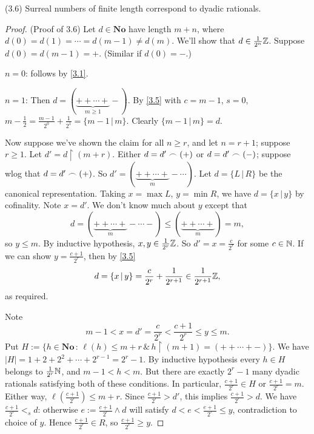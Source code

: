 \begin{proposition} (3.6)
Surreal numbers of finite length correspond to dyadic rationals.
\label{3.6}
\end{proposition}

\begin{proof} (Proof of 3.6)
Let $d\in\mathbf{No}$ have length $m+n$, where $d(0) = d(1) = \cdots = d(m-1) \ne d(m)$. We'll show that 
$d\in\frac1{2^n}\mathbb{Z}$. Suppose $d(0) = d(m-1) = {+}$. (Similar if $d(0) = {-}$.) 
\begin{description}
\item $n=0$: follows by \eqref{3.1}.
\item $n=1$: Then $d = (\underbrace{++\cdots+}_{m\ge1}-)$. By \eqref{3.5} with $c = m-1$, $s=0$, $m-\frac12 = \frac{m-1}{2^0} + \frac{1}{2^1} = \{m-1 \,|\, m\}$. Clearly $\{m-1 \,|\, m\} = d$.
\end{description}
Now suppose we've shown the claim for all $n\ge r$, and let $n = r+1$; suppose $r\ge 1$. Let $d' = d\restriction (m+r)$.
Either $d = d'\frown (+)$ or $d=d'\frown (-)$; suppose wlog that $d = d'\frown (+)$. So $d' = (\underbrace{++\cdots+}_{m}-\cdots)$. Let $d = \{L \,|\, R\}$ be the canonical representation.
Taking $x=\max L$, $y = \min R$, we have $d = \{x \,|\, y\}$ by cofinality. Note $x = d'$. We don't know much about $y$ 
except that
\[ d = (\underbrace{++\cdots +}_{m}-\cdots -)\le (\underbrace{++\cdots+}_{m}) = m, \]
so $y\le m$. By inductive hypothesis, $x,y\in \frac1{2^r}\mathbb{Z}$. So $d' = x = \frac{c}{2^r}$ for some $c\in\mathbb{N}$. 
If we can show $y = \frac{c+1}{2^r}$, then by \eqref{3.5} 
\[ d = \{x \,|\, y \} = \frac{c}{2^r} + \frac{1}{2^{r+1}} \in \frac1{2^{r+1}}\mathbb{Z}, \]
as required.

Note 
\[m-1<x = d' = \frac{c}{2^r} < \frac{c+1}{2^r} \le y \le m. \]
Put $H := \{ h\in\mathbf{No} \,:\, \ell(h)\le m+ r \,\&\, h\restriction(m+1) = (++\cdots+-)\}$.
We have $|H| = 1+2+2^2+\cdots + 2^{r-1} = 2^r - 1$. By inductive hypothesis every $h\in H$ belongs to $\frac1{2^r}\mathbb{N}$,
and $m-1<h<m$. But there are exactly $2^r - 1$ many dyadic rationals satisfying both of these conditions. 
In particular, $\frac{c+1}{2^r}\in H$ or $\frac{c+1}{2^r}=m$. Either way, $\ell(\frac{c+1}{2^r})\le m+r$.
Since $\frac{c+1}{2^r} > d'$, this implies $\frac{c+1}{2^r} > d$. We have $\frac{c+1}{2^r} <_s d$:
otherwise $e := \frac{c+1}{2^r} \wedge d$ will satisfy $d < e < \frac{e+1}{2^r} \le y$, contradiction to choice of $y$.
Hence $\frac{c+1}{2^r}\in R$, so $\frac{c+1}{2^r}\ge y$.
\end{proof}

